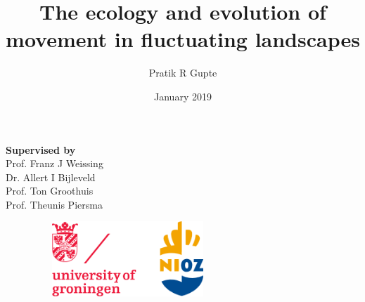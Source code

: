 

\title{\huge{The ecology and evolution of movement in fluctuating landscapes}}
\author{{Pratik R Gupte}}
\date{January 2019}

{\parindent0pt
	
{\large{\textbf{\textsf{Supervised by}}} \\
\large{Prof. Franz J Weissing} \\
\large{Dr. Allert I Bijleveld} \\
\large{Prof. Ton Groothuis} \\
\large{Prof. Theunis Piersma}}

}

\begin{figure}[h!]
	
	\includegraphics[width=200pt, height = 80pt]{logo_affils.eps}
	\caption{}
	\label{fig:logoaffils}
\end{figure}



\newpage

